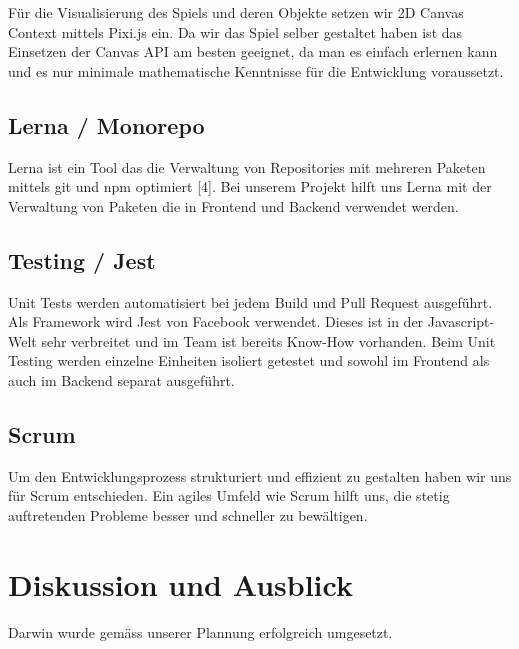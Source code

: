 \documentclass[11pt,a4paper,titlepage]{article}
\begin{document}
Für die Visualisierung des Spiels und deren Objekte setzen wir 2D Canvas Context mittels Pixi.js ein. Da wir das Spiel selber gestaltet haben ist das Einsetzen der Canvas API am besten geeignet, da man es einfach erlernen kann und es nur minimale mathematische Kenntnisse für die Entwicklung voraussetzt.

\subsection{Lerna / Monorepo}
Lerna ist ein Tool das die Verwaltung von Repositories mit mehreren Paketen mittels git und npm optimiert [4]. Bei unserem Projekt hilft uns Lerna mit der Verwaltung von Paketen die in Frontend und Backend verwendet werden.

\subsection{Testing / Jest}
Unit Tests werden automatisiert bei jedem Build und Pull Request ausgeführt.
Als Framework wird Jest von Facebook verwendet. Dieses ist in der Javascript-Welt sehr verbreitet und im Team ist bereits Know-How vorhanden.
Beim Unit Testing werden einzelne Einheiten isoliert getestet und sowohl im Frontend als auch im Backend separat ausgeführt.

\subsection{Scrum}
Um den Entwicklungsprozess strukturiert und effizient zu gestalten haben wir uns für Scrum entschieden. Ein agiles Umfeld wie Scrum hilft uns, die stetig auftretenden Probleme besser und schneller zu bewältigen.

\section{Diskussion und Ausblick}
Darwin wurde gemäss unserer Plannung erfolgreich umgesetzt.


%
\end{document}
